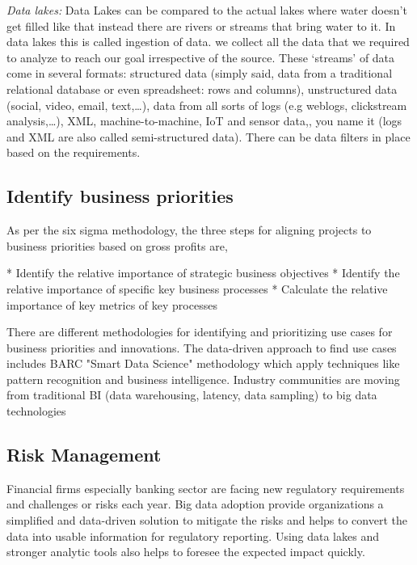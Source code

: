 \documentclass[sigconf]{acmart}
\begin{document}
\textit{Data lakes:} Data Lakes can be compared to the actual lakes where water doesn't get filled like that instead there are rivers or streams that bring water to it. In data lakes this is called ingestion of data. we collect all the data that we required to analyze to reach our goal irrespective of the source. These ‘streams’ of data come in several formats: structured data (simply said, data from a traditional relational database or even spreadsheet: rows and columns), unstructured data (social, video, email, text,…), data from all sorts of logs (e.g weblogs, clickstream analysis,…), XML, machine-to-machine, IoT and sensor data,, you name it (logs and XML are also called semi-structured data). There can be data filters in place based on the requirements.\cite{Data-lakes}



\subsection{Identify business priorities}
As per the six sigma methodology, the three steps for aligning projects to business priorities based on gross profits are, 

    * Identify the relative importance of strategic business objectives
    * Identify the relative importance of specific key business processes
    * Calculate the relative importance of key metrics of key processes
    
\cite{businesspriorities}There are different methodologies for identifying and prioritizing use cases for business priorities and innovations. The data-driven approach to find use cases includes BARC "Smart Data Science" methodology which apply techniques like pattern recognition and business intelligence. Industry communities are moving from traditional BI (data warehousing, latency, data sampling) to big data technologies
    
\subsection{Risk Management}
Financial firms especially banking sector are facing new regulatory requirements and challenges or risks each year. Big data adoption provide organizations a simplified and data-driven solution to mitigate the risks and helps to convert the data into usable information for regulatory reporting. Using data lakes and stronger analytic tools   also helps to foresee the expected impact quickly.\cite{https://www-935.ibm.com}
\end{document}
